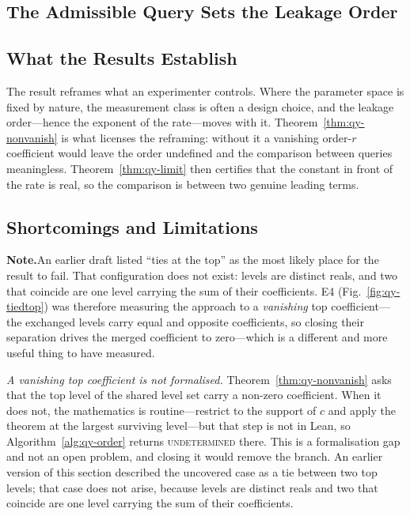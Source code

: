 \documentclass[conference]{IEEEtran}
\theoremstyle{definition}
\newif\ifshownotes\shownotestrue
\newcommand{\NOTEPAR}[1]{\ifshownotes\par\vspace{2pt}\noindent%
  {\color{notecol}\textsf{\footnotesize\textbf{Note.}\;#1}}\par\vspace{2pt}\fi}
\begin{document}
\subsection{The Admissible Query Sets the Leakage Order}
\label{sec:qy-discussion}

\subsection{What the Results Establish}

The result reframes what an experimenter controls. Where the parameter space is fixed by
nature, the measurement class is often a design choice, and the leakage order---hence the
exponent of the rate---moves with it. Theorem~\ref{thm:qy-nonvanish} is what licenses the
reframing: without it a vanishing order-$r$ coefficient would leave the order undefined and
the comparison between queries meaningless. Theorem~\ref{thm:qy-limit} then certifies that the
constant in front of the rate is real, so the comparison is between two genuine leading
terms.

\subsection{Shortcomings and Limitations}
\NOTEPAR{An earlier draft listed ``ties at the top'' as the most likely place for the
result to fail. That configuration does not exist: levels are distinct reals, and two that
coincide are one level carrying the sum of their coefficients. E4 (Fig.~\ref{fig:qy-tiedtop}) was
therefore measuring the approach to a \emph{vanishing} top coefficient---the exchanged levels
carry equal and opposite coefficients, so closing their separation drives the merged
coefficient to zero---which is a different and more useful thing to have measured.}
\label{sec:qy-limits}

\emph{A vanishing top coefficient is not formalised.} Theorem~\ref{thm:qy-nonvanish} asks that
the top level of the shared level set carry a non-zero coefficient. When it does not, the
mathematics is routine---restrict to the support of $c$ and apply the theorem at the largest
surviving level---but that step is not in Lean, so Algorithm~\ref{alg:qy-order} returns
\textsc{undetermined} there. This is a formalisation gap and not an open problem, and closing
it would remove the branch. An earlier version of this section described the uncovered case as
a tie between two top levels; that case does not arise, because levels are distinct reals and
two that coincide are one level carrying the sum of their coefficients.
\end{document}
